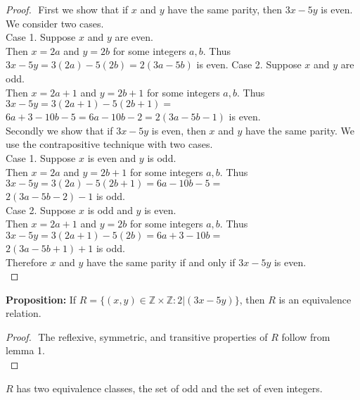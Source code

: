\documentclass{article}
\begin{document}
\begin{proof}
$ $\newline
First we show that if $x$ and $y$ have the same parity, then $3x-5y$ is even. We consider two cases.\\
Case 1. Suppose $x$ and $y$ are even.\\
\indent Then $x=2a$ and $y=2b$ for some integers $a, b$. Thus $3x-5y=3(2a)-5(2b)=2(3a-5b)$ is even.
Case 2. Suppose $x$ and $y$ are odd.\\
\indent Then $x=2a+1$ and $y=2b+1$ for some integers $a, b$. Thus $3x-5y=3(2a+1)-5(2b+1)=$\\
\indent $6a+3-10b-5=6a-10b-2=2(3a-5b-1)$ is even.\\

\noindent Secondly we show that if $3x-5y$ is even, then $x$ and $y$ have the same parity. We use the contrapositive technique with two cases.\\
Case 1. Suppose $x$ is even and $y$ is odd.\\
\indent Then $x=2a$ and $y=2b+1$ for some integers $a, b$. Thus $3x-5y=3(2a)-5(2b+1)=6a-10b-5=$\\
\indent $2(3a-5b-2)-1$ is odd.\\
Case 2. Suppose $x$ is odd and $y$ is even.\\
\indent Then $x=2a+1$ and $y=2b$ for some integers $a, b$. Thus $3x-5y=3(2a+1)-5(2b)=6a+3-10b=$\\
\indent $2(3a-5b+1)+1$ is odd.\\

\noindent Therefore $x$ and $y$ have the same parity if and only if $3x - 5y$ is even.\\

\end{proof}
\noindent\textbf{Proposition:} If $R=\{(x,y) \in \mathbb{Z}\times\mathbb{Z} : 2|(3x-5y) \}$, then $R$ is an equivalence relation.
\begin{proof}
$ $\newline
\noindent The reflexive, symmetric, and transitive properties of $R$ follow from lemma 1.\\
\end{proof}
\noindent $R$ has two equivalence classes, the set of odd and the set of even integers.\\
\end{document}
